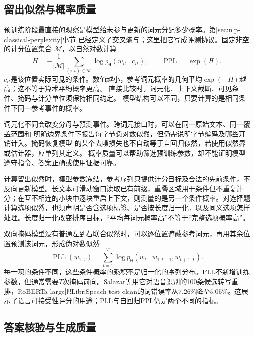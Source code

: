 \subsection{留出似然与概率质量}
\label{sec:nlp-eval-likelihood}

预训练阶段最直接的观察是模型给未参与更新的词元分配多少概率。第\ref{sec:nlp-classical-perplexity}小节
已经定义了交叉熵与；这里把它写成评测协议。固定非空的计分位置集合
$\mathcal M$，以自然对数计算
\begin{equation}
 H=-\frac{1}{|\mathcal M|}\sum_{(i,t)\in\mathcal M}
 \log p_{\bm\theta}(w_{it}\mid c_{it}),\qquad \operatorname{PPL}=\exp(H).
 \label{eq:nlp-eval-ppl}
\end{equation}
$c_{it}$是该位置实际可见的条件。数值越小，参考词元概率的几何平均$\exp(-H)$越高；这不等于算术平均概率更高。
直接比较时，词元化、上下文截断、可见条件、掩码与计分单位须保持相同约定。
模型结构可以不同，只要计算的是相同条件下同一参考事件的概率。

词元化不同会改变分母与预测事件。跨词元接口时，可以在同一原始文本、同一覆盖范围和
明确边界条件下报告每字节负对数似然，但仍需说明字节编码及哪些开销计入。掩码恢复模型
的某个去噪损失也不自动等于自回归似然，若使用似然界或估计器，应单列其定义。
概率质量可以帮助筛选预训练参数，却不能证明模型遵守指令、答案正确或使用证据可靠。

计算留出似然时，模型参数冻结，参考序列只提供计分目标及合法的先前条件，不反向更新模型。长文本可滑动窗口读取已有前缀，重叠区域用于条件但不重复计分；在互不相连的小块中逐块重启上下文，则测量的是另一个条件概率。对选择题计算选项似然，也须声明是否含选项标签、是否按长度归一化，以及同义选项怎样处理。长度归一化改变排序目标，“平均每词元概率高”不等于“完整选项概率高”。

双向掩码模型没有普通左到右联合似然时，可以逐位置遮蔽参考词元，再用其余位置预测该词元，形成伪对数似然
\begin{equation}
 \operatorname{PLL}(w_{1:T})
 =\sum_{t=1}^{T}\log p_{\bm\theta}(w_t\mid w_{1:t-1},w_{t+1:T}).
 \label{eq:nlp-eval-pseudo-likelihood}
\end{equation}
每一项的条件不同，这些条件概率的乘积不是归一化的序列分布。PLL不新增训练参数，但通常需要$T$次掩码前向。Salazar等用它对语音识别的100条候选转写重排，RoBERTa-large把LibriSpeech test-clean的词错误率从$7.26\%$降至$5.05\%$。这展示了语言可接受性评分的用途；PLL与自回归PPL仍是两个不同的指标。

\subsection{答案核验与生成质量}
\label{sec:nlp-eval-answer}

